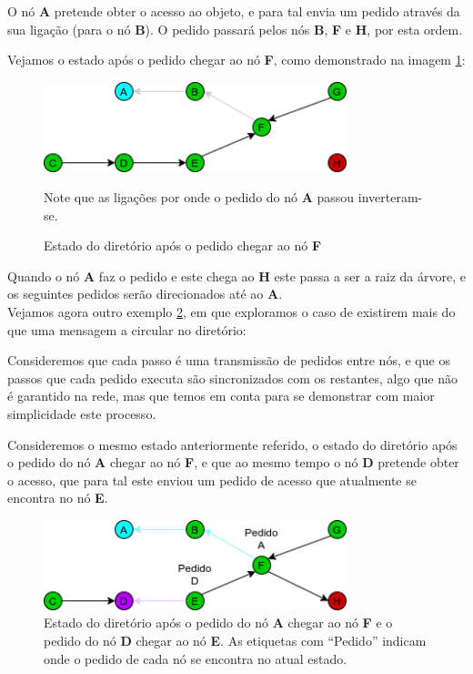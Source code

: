 O nó \textbf{A} pretende obter o acesso ao objeto, e para tal envia um pedido através da sua ligação (para o nó \textbf{B}).
O pedido passará pelos nós \textbf{B}, \textbf{F} e \textbf{H}, por esta ordem.

Vejamos o estado após o pedido chegar ao nó \textbf{F}, como demonstrado na imagem \ref{motivacao:img:apos_chegar_f}:

\begin{figure}[!htb]
\centering
\includegraphics[width=250pt]{um_pedido_2.png}
\caption{Estado do diretório após o pedido chegar ao nó \textbf{F}}
Note que as ligações por onde o pedido do nó \textbf{A} passou inverteram-se.
\label{motivacao:img:apos_chegar_f}
\end{figure}


Quando o nó \textbf{A} faz o pedido e este chega ao \textbf{H} este passa a ser a raiz da árvore,
e os seguintes pedidos serão direcionados até ao \textbf{A}.\\



Vejamos agora outro exemplo \ref{motivacao:img:apos_chegar_f_etiquetas},
em que exploramos o caso de existirem mais do que uma mensagem a circular no diretório:

Consideremos que cada passo é uma transmissão de pedidos entre nós, e que os passos que cada pedido executa são sincronizados com os restantes,
algo que não é garantido na rede, mas que temos em conta para se demonstrar com maior simplicidade este processo.

Consideremos o mesmo estado anteriormente referido,
o estado do diretório após o pedido do nó \textbf{A} chegar ao nó \textbf{F}, 
e que ao mesmo tempo o nó \textbf{D} pretende obter o acesso,
que para tal este enviou um pedido de acesso que atualmente se encontra no nó \textbf{E}.


\begin{figure}[!htb]
\centering
\includegraphics[width=250pt]{dois_pedidos_1.png}
\caption{Estado do diretório após o pedido do nó \textbf{A} chegar ao nó \textbf{F} e o pedido do nó \textbf{D} chegar ao nó \textbf{E}. 
As etiquetas com ``Pedido'' indicam onde o pedido de cada nó se encontra no atual estado.}
\label{motivacao:img:apos_chegar_f_etiquetas}
\end{figure}

